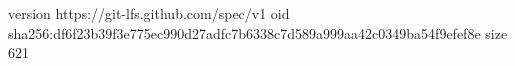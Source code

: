 version https://git-lfs.github.com/spec/v1
oid sha256:df6f23b39f3e775ec990d27adfc7b6338c7d589a999aa42c0349ba54f9efef8e
size 621
